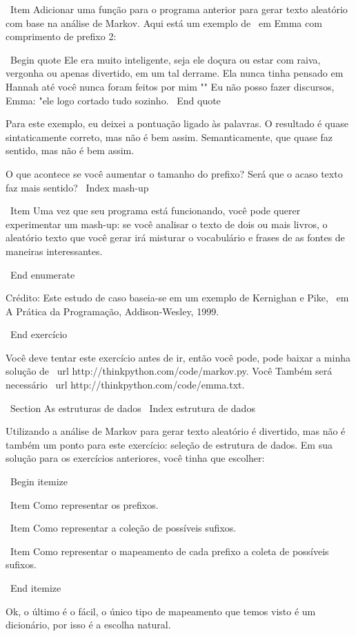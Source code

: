 \documentclass[10pt]{book}
\begin{document}
\begin {itemize}
{{{{{{{{{\ Item Adicionar uma função para o programa anterior para gerar texto aleatório
com base na análise de Markov. Aqui está um exemplo de {\ em Emma}
com comprimento de prefixo 2:

\ Begin {quote}
Ele era muito inteligente, seja ele doçura ou estar com raiva, vergonha ou apenas
divertido, em um tal derrame. Ela nunca tinha pensado em Hannah até você
nunca foram feitos por mim "" Eu não posso fazer discursos, Emma: "ele logo cortado
tudo sozinho.
\ End {quote}

Para este exemplo, eu deixei a pontuação ligado às palavras.
O resultado é quase sintaticamente correto, mas não é bem assim.
Semanticamente, que quase faz sentido, mas não é bem assim.

O que acontece se você aumentar o tamanho do prefixo? Será que o acaso
texto faz mais sentido?
\ Index {mash-up}

\ Item Uma vez que seu programa está funcionando, você pode querer experimentar um mash-up:
se você analisar o texto de dois ou mais livros, o aleatório
texto que você gerar irá misturar o vocabulário e frases de
as fontes de maneiras interessantes.

\ End {enumerate}

Crédito: Este estudo de caso baseia-se em um exemplo de Kernighan e
Pike, {\ em A Prática da Programação}, Addison-Wesley, 1999.

\ End {} exercício

Você deve tentar este exercício antes de ir, então você pode, pode
baixar a minha solução de \ url {http://thinkpython.com/code/markov.py}. Você
Também será necessário \ url {http://thinkpython.com/code/emma.txt}.


\ Section {As estruturas de dados}
\ Index {estrutura de dados}

Utilizando a análise de Markov para gerar texto aleatório é divertido, mas não é
também um ponto para este exercício: seleção de estrutura de dados. Em sua
solução para os exercícios anteriores, você tinha que escolher:

\ Begin {itemize}

\ Item Como representar os prefixos.

\ Item Como representar a coleção de possíveis sufixos.

\ Item Como representar o mapeamento de cada prefixo
a coleta de possíveis sufixos.

\ End {itemize}

Ok, o último é o fácil, o único tipo de mapeamento que temos
visto é um dicionário, por isso é a escolha natural.

}}}}}}}}}
\end{itemize}
\end{document}
